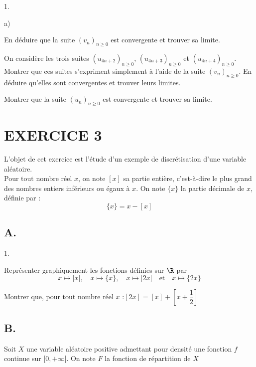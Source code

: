 \documentclass[11pt]{article}%
\begin{document}
\begin{noliste}{1.}
\begin{noliste}{a)}
\item En déduire que la suite $(v_{n})_{n\geq 0}$ est convergente et
trouver sa limite.
\end{noliste}

\item On considère les trois suites $(u_{4n + 2})_{n\geq 0}$, $(u_{4n +
3})_{n\geq 0}$ et $(u_{4n + 4})_{n\geq 0}$. Montrer que ces
suites s'expriment simplement à l'aide de la suite $(v_{n})_{n\geq 0}$.
En déduire qu'elles sont convergentes et trouver leurs limites.

\item Montrer que la suite $(u_{n})_{n\geq 0}$ est convergente et
trouver sa limite.
\end{noliste}

\section*{EXERCICE 3}

L'objet de cet exercice est l'étude d'un exemple de discrétisation
d'une
variable aléatoire.\\
Pour tout nombre réel $x$, on note $[x]$ sa partie entière,
c'est-à-dire le
plus grand des nombres entiers inférieurs ou égaux à $x.$ On note
$\{x\}$ la
partie décimale de $x$, définie par :
\[
\{x\} = x-[x]
\]

\subsection*{A.}

\begin{noliste}{1.}
 \setlength{\itemsep}{4mm}
\item Représenter graphiquement les fonctions définies sur $\R$ par 
\[
x\mapsto \lbrack x],\quad x\mapsto \{x\},\quad x\mapsto \lbrack
2x]\quad 
\text{et}\quad x\mapsto \{2x\}
\]

\item Montrer que, pour tout nombre réel $x$ :$[2x] = [x] + [x +
\dfrac{1}{2}]$
\end{noliste}

\subsection*{B. }

Soit $X$ une variable aléatoire positive admettant pour densité une
fonction 
$f$ continue sur $[0, + \infty \lbrack $. On note $F$ la fonction de
répartition de $X$
\end{document}
